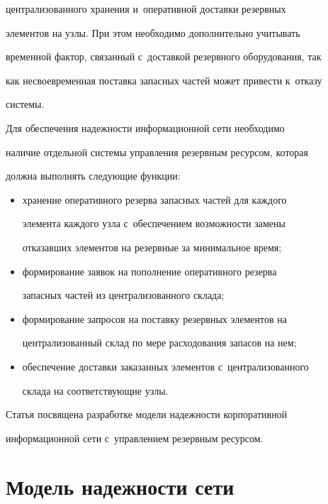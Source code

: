 централизованного хранения и~оперативной доставки резервных 


элементов на узлы. При этом необходимо дополнительно учитывать 


временной фактор, связанный с~доставкой резервного оборудования, так 


как несвоевременная поставка запасных частей может привести к~отказу 


системы. 


   


   Для обеспечения надежности информационной сети необходимо 


наличие отдельной системы управления резервным ресурсом, которая 


должна выполнять следующие функции:


   \begin{itemize}


\item хранение оперативного резерва запасных частей для каж\-до\-го 


элемента каж\-до\-го узла с~обеспечением возможности замены 


отказавших элементов на резервные за минимальное время;


\item формирование заявок на пополнение оперативного резерва 


запасных частей из централизованного склада;


\item формирование запросов на поставку резервных элементов на 


централизованный склад по мере расходования запасов на нем;


\item обеспечение доставки заказанных элементов с~централизованного 


склада на соответствующие узлы.


   \end{itemize}


   


   Статья посвящена разработке модели надежности корпоративной 


информационной сети с~управлением резервным ресурсом.


   


\section{Модель надежности сети}





